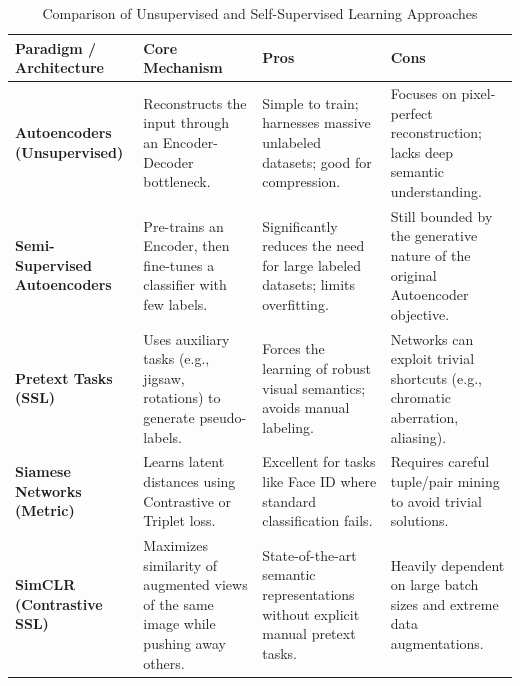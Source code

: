 \begin{table}[h]
\centering
\begin{tabularx}{\textwidth}{| >{\centering\arraybackslash}m{3.5cm} | X | X | X |}
\hline
\textbf{Paradigm / Architecture} & \textbf{Core Mechanism} & \textbf{Pros} & \textbf{Cons} \\
\hline
\textbf{Autoencoders (Unsupervised)} & Reconstructs the input through an Encoder-Decoder bottleneck. & Simple to train; harnesses massive unlabeled datasets; good for compression. & Focuses on pixel-perfect reconstruction; lacks deep semantic understanding. \\
\hline
\textbf{Semi-Supervised Autoencoders} & Pre-trains an Encoder, then fine-tunes a classifier with few labels. & Significantly reduces the need for large labeled datasets; limits overfitting. & Still bounded by the generative nature of the original Autoencoder objective. \\
\hline
\textbf{Pretext Tasks (SSL)} & Uses auxiliary tasks (e.g., jigsaw, rotations) to generate pseudo-labels. & Forces the learning of robust visual semantics; avoids manual labeling. & Networks can exploit trivial shortcuts (e.g., chromatic aberration, aliasing). \\
\hline
\textbf{Siamese Networks (Metric)} & Learns latent distances using Contrastive or Triplet loss. & Excellent for tasks like Face ID where standard classification fails. & Requires careful tuple/pair mining to avoid trivial solutions. \\
\hline
\textbf{SimCLR (Contrastive SSL)} & Maximizes similarity of augmented views of the same image while pushing away others. & State-of-the-art semantic representations without explicit manual pretext tasks. & Heavily dependent on large batch sizes and extreme data augmentations. \\
\hline
\end{tabularx}
\caption{Comparison of Unsupervised and Self-Supervised Learning Approaches}
\end{table}

